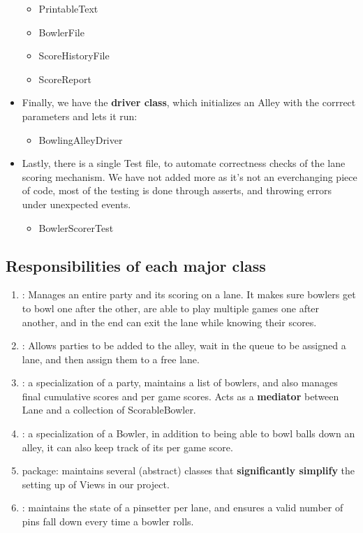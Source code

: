 \begin{itemize}
\begin{itemize}
              \item PrintableText
              \item BowlerFile
              \item ScoreHistoryFile
              \item ScoreReport
          \end{itemize}
    \item Finally, we have the \textbf{driver class}, which initializes an Alley with the corrrect parameters and lets it run:
          \begin{itemize}
              \item BowlingAlleyDriver
          \end{itemize}
    \item Lastly, there is a single Test file, to automate correctness checks of the lane scoring mechanism. We have not added more as it's not an everchanging piece of code, most of the testing is done through asserts, and throwing errors under unexpected events.
          \begin{itemize}
              \item BowlerScorerTest
          \end{itemize}
\end{itemize}

\subsection{Responsibilities of each major class}

\begin{enumerate}
    \item {}: Manages an entire party and its scoring on a lane. It makes sure bowlers get to bowl one after the other, are able to play multiple games one after another, and in the end can exit the lane while knowing their scores.
    \item {}: Allows parties to be added to the alley, wait in the queue to be assigned a lane, and then assign them to a free lane.
    \item {}: a specialization of a party, maintains a list of bowlers, and also manages final cumulative scores and per game scores. Acts as a \textbf{mediator} between Lane and a collection of ScorableBowler.
    \item {}: a specialization of a Bowler, in addition to being able to bowl balls down an alley, it can also keep track of its per game score.
    \item {} package: maintains several (abstract) classes that \textbf{significantly simplify} the setting up of Views in our project.
    \item {}: maintains the state of a pinsetter per lane, and ensures a valid number of pins fall down every time a bowler rolls.
\end{enumerate}


